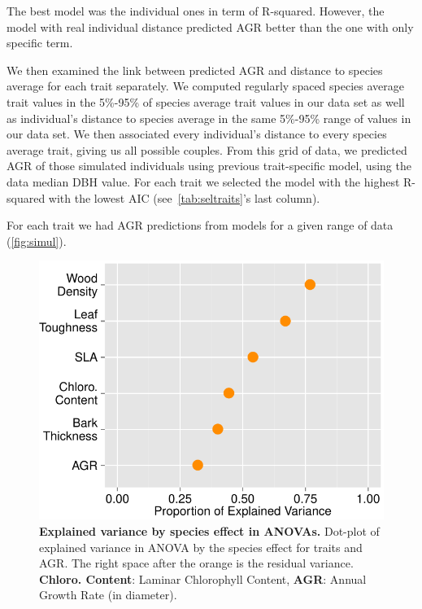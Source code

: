 The best model was the individual ones in term of R-squared. However, the model with real individual distance predicted AGR better than the one with only specific term.

We then examined the link between predicted AGR and distance to species average for each trait separately. We computed regularly spaced species average trait values in the 5\%-95\% of species average trait values in our data set as well as individual's distance to species average in the same 5\%-95\% range of values in our data set. We then associated every individual's distance to every species average trait, giving us all possible couples. From this grid of data, we predicted AGR of those simulated individuals using previous trait-specific model, using the data median DBH value. For each trait we selected the model with the highest R-squared with the lowest AIC (see~\autoref{tab:seltraits}'s last column).

For each trait we had AGR predictions from models for a given range of data (\autoref{fig:simul}).

\begin{figure}[!ht]
	\centering
	\includegraphics{figures/Aov_Var_Traits_2015-05-25.pdf}
	\caption{\textbf{Explained variance by species effect in ANOVAs.} Dot-plot of explained variance in ANOVA by the species effect for traits and AGR. The right space after the orange is the residual variance. \textbf{Chloro. Content}: Laminar Chlorophyll Content, \textbf{AGR}: Annual Growth Rate (in diameter).}
	\label{fig:aov}
\end{figure}

